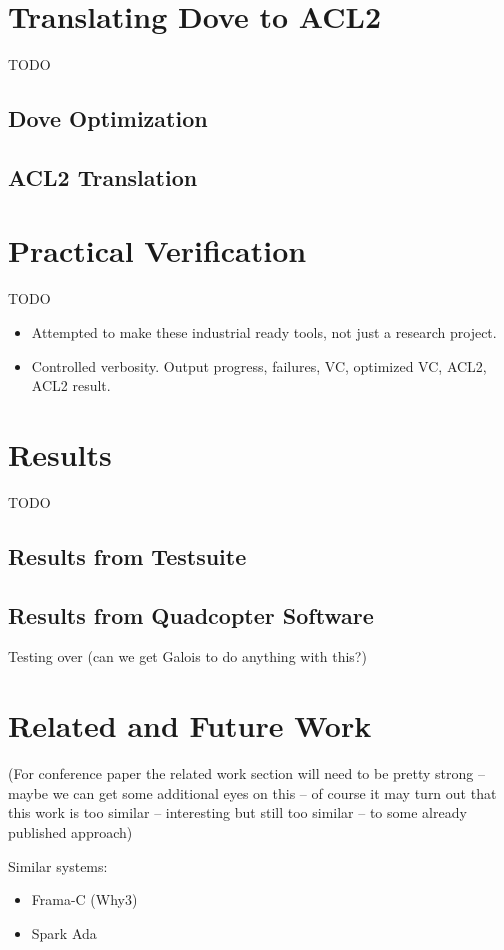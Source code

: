 \documentclass{article}
\begin{document}
\section{Translating Dove to ACL2}
TODO
\subsection{Dove Optimization}
\subsection{ACL2 Translation}

\section{Practical Verification}
TODO
\begin{itemize}
  \item Attempted to make these industrial ready tools, not just a research project.
  \item Controlled verbosity.  Output progress, failures, VC, optimized VC, ACL2, ACL2 result.
\end{itemize}

\section{Results}
TODO
\subsection{Results from Testsuite}
\subsection{Results from Quadcopter Software}
Testing over (can we get Galois to do anything with this?)

\section{Related and Future Work}
(For conference paper the related work section will need to be 
pretty strong -- maybe we can get some additional eyes on this -- 
of course it may turn out that this work is too similar -- interesting
but still too similar -- to some already published approach)

Similar systems:
\begin{itemize}
  \item Frama-C (Why3)
  \item Spark Ada
\end{itemize}
\end{document}
